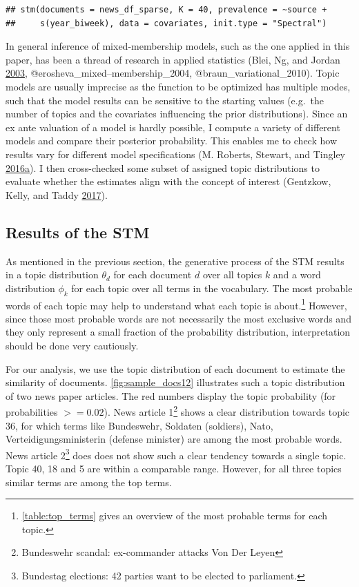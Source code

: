 \documentclass[
]{article}
\begin{document}
\begin{verbatim}
## stm(documents = news_df_sparse, K = 40, prevalence = ~source + 
##     s(year_biweek), data = covariates, init.type = "Spectral")
\end{verbatim}

In general inference of mixed-membership models, such as the one applied
in this paper, has been a thread of research in applied statistics
(Blei, Ng, and Jordan \protect\hyperlink{ref-blei_latent_2003}{2003},
@erosheva\_mixed--membership\_2004, @braun\_variational\_2010). Topic
models are usually imprecise as the function to be optimized has
multiple modes, such that the model results can be sensitive to the
starting values (e.g.~the number of topics and the covariates
influencing the prior distributions). Since an ex ante valuation of a
model is hardly possible, I compute a variety of different models and
compare their posterior probability. This enables me to check how
results vary for different model specifications (M. Roberts, Stewart,
and Tingley
\protect\hyperlink{ref-roberts_navigating_2016}{2016}\protect\hyperlink{ref-roberts_navigating_2016}{a}).
I then cross-checked some subset of assigned topic distributions to
evaluate whether the estimates align with the concept of interest
(Gentzkow, Kelly, and Taddy
\protect\hyperlink{ref-gentzkow_text_2017}{2017}).

\hypertarget{results-of-the-stm}{%
\subsection{Results of the STM}\label{results-of-the-stm}}

As mentioned in the previous section, the generative process of the STM
results in a topic distribution \(\theta_d\) for each document \(d\)
over all topics \(k\) and a word distribution \(\phi_k\) for each topic
over all terms in the vocabulary. The most probable words of each topic
may help to understand what each topic is about.\footnote{\autoref{table:top_terms}
  gives an overview of the most probable terms for each topic.} However,
since those most probable words are not necessarily the most exclusive
words and they only represent a small fraction of the probability
distribution, interpretation should be done very cautiously.

For our analysis, we use the topic distribution of each document to
estimate the similarity of documents. \autoref{fig:sample_docs12}
illustrates such a topic distribution of two news paper articles. The
red numbers display the topic probability (for probabilities
\(>= 0.02\)). News article 1\footnote{Bundeswehr scandal: ex-commander
  attacks Von Der Leyen} shows a clear distribution towards topic 36,
for which terms like Bundeswehr, Soldaten (soldiers), Nato,
Verteidigungsministerin (defense minister) are among the most probable
words. News article 2\footnote{Bundestag elections: 42 parties want to
  be elected to parliament.} does does not show such a clear tendency
towards a single topic. Topic 40, 18 and 5 are within a comparable
range. However, for all three topics similar terms are among the top
terms.
\end{document}
